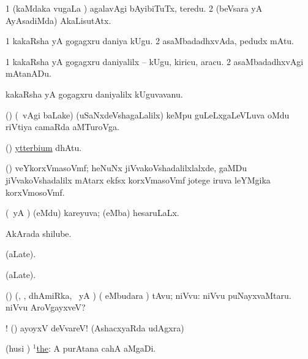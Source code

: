 \bentry
{} 
\gl{\kirxvi} 
\bmng
\bnum
\num{1} (kaMdaka \mo vugaLa \vi) agalavAgi bAyibiTuTx, teredu. 
\num{2} (beVsara yA AyAsadiMda) AkaLisutAtx.
\enum
\emng
\eentry

\bentry
{} 
\gl{\nA} 
\bmng
\bnum
\num{1} kakaRsha yA gogagxru daniya kUgu. 
\num{2} asaMbadadhxvAda, pedudx  mAtu.
\enum
\emng
\eentry

\bentry
{} 
\gl{\akirx} 
\bmng
\bnum
\num{1} kakaRsha yA gogagxru daniyalilx -- kUgu, kiricu, aracu. 
\num{2} asaMbadadhxvAgi mAtanADu.
\enum
\emng 
\eentry

\bentry
{} 
\gl{\nA} 
\bmng
kakaRsha yA gogagxru daniyalilx kUguvavanu.
\emng
\eentry

\bentry
{} 
\gl{\nA} 
\bmng
(\bava) (\sA\  \Eva vAgi baLake) (uSaNxdeVshagaLalilx) keMpu guLeLxgaLeVLuva oMdu riVtiya camaRda aMTuroVga.
\emng
\eentry

\bentry
{}
\gl{\saMkeV}
\bmng
(\ravi) \hyperlink{ytterbium}{ytterbium} dhAtu.
\emng
\eentry

\bentry
{} 
\gl{\nA}
\bmng
(\jiVvi) veYkorxVmasoVmf; heNuNx jiVvakoVshadalilxlalxde, gaMDu jiVvakoVshadalilx mAtarx  ekfsx korxVmasoVmf jotege iruva leYMgika korxVmosoVmf.
\emng
\eentry

\bentry
{} 
\gl{\gu}
\bmng
(\pArxparx\ yA \hA) (eMdu) kareyuva; (eMba) hesaruLaLx.
\emng
\eentry

\bentry
{} 
\gl{\nA} 
\bmng
{} AkArada shilube.
\emng
\eentry

\bentry
{}
\gl{\saMkiSx}
\bmng
{} (aLate).
\emng
\eentry

\bentry
{}
\gl{\saMkiSx}
\bmng
{} (aLate).
\emng
\eentry

\bentry
{} 
\gl{\sanA} 
\bmng
(\bava) (\kAparx, \pArxparx, dhAmiRka, \pArxM\ yA \hA)
( eMbudara \bava) tAvu; niVvu:   niVvu puNayxvaMtaru.  niVvu AroVgayxveV?
\emng

\noindent
\gl{\pagu}
\bmng
{}! (\hA) ayoyxV deVvareV! (AshacxyaRda udAgxra)
\emng
\eentry

\bentry
{} 
\gl{\gu}
\bmng
(husi \pArxparx) \hyperref{kandict_t.pdf}{T}{the(1)}{$^1$the}:  A purAtana cahA aMgaDi. 
\emng 
\eentry

